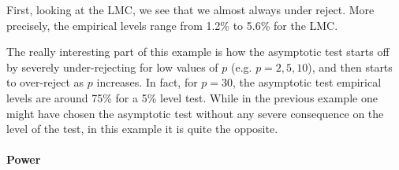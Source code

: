 \documentclass[]{article}\usepackage[]{graphicx}\usepackage[]{color}
\begin{document}
\begin{table}[H]
	\centering
	\caption{Empirical levels for 1000 replications of the Wald statistic where $\alpha = 5\%$, $\theta_1=0$ and $\theta_2=...=\theta_p=0$,  testing $H_0: \theta_1^2 + ...  +\theta_p^2 =0$ against $H_1: \theta_1^2 + ...  +\theta_p^2  \neq 0$}
	\label{tbl:W:5}
\end{table}


First, looking at the LMC, we see that we almost always under reject. More precisely, the empirical levels range from 1.2\% to 5.6\% for the LMC.

The really interesting part of this example is how the asymptotic test starts off by severely under-rejecting for low values of $p$ (e.g. $p=2,5,10$), and then starts to over-reject as $p$ increases. In fact, for $p=30$, the asymptotic test empirical levels are around 75\% for a 5\% level test. While in the previous example one might have chosen the asymptotic test without any severe consequence on the level of the test, in this example it is quite the opposite.

\paragraph{Power}
\end{document}
